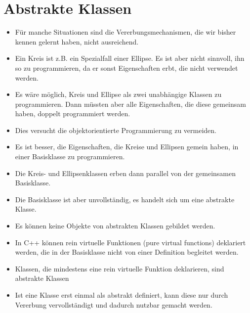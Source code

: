 \section{Abstrakte Klassen}
\begin{itemize}
	\item Für manche Situationen sind die Vererbungsmechanismen, die wir bisher kennen gelernt haben, nicht ausreichend.
	\item Ein Kreis ist z.B. ein Spezialfall einer Ellipse. Es ist aber nicht sinnvoll, ihn so zu programmieren, da er sonst Eigenschaften erbt, die nicht verwendet werden.
	\item Es wäre möglich, Kreis und Ellipse als zwei unabhängige Klassen zu programmieren. Dann müssten aber alle Eigenschaften, die diese gemeinsam haben, doppelt programmiert werden.
	\item Dies versucht die objektorientierte Programmierung zu vermeiden.
	\item Es ist besser, die Eigenschaften, die Kreise und Ellipsen gemein haben, in einer Basisklasse zu programmieren.
	\item Die Kreis- und Ellipsenklassen erben dann parallel von der gemeinsamen Basisklasse.
	\item Die Basisklasse ist aber unvollständig, es handelt sich um eine abstrakte Klasse.
	\item Es können keine Objekte von abstrakten Klassen gebildet werden.
	\item In C++ können rein virtuelle Funktionen (pure virtual functions) deklariert werden, die in der Basisklasse nicht von einer Definition begleitet werden.
	\item Klassen, die mindestens eine rein virtuelle Funktion deklarieren, sind abstrakte Klassen
	\item Ist eine Klasse erst einmal als abstrakt definiert, kann diese nur durch Vererbung vervollständigt und dadurch nutzbar gemacht werden.
\end{itemize}

